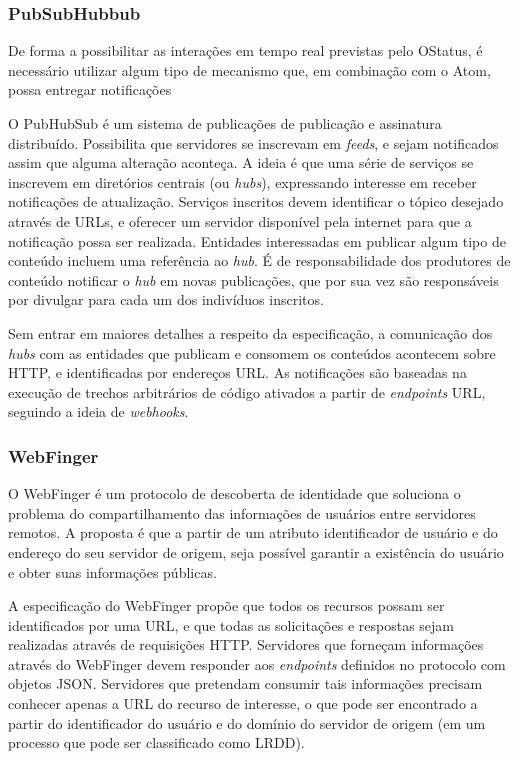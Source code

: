 \subsubsection{PubSubHubbub}

De forma a possibilitar as interações em tempo real previstas pelo  OStatus, é
necessário utilizar algum tipo de mecanismo que, em combinação com o Atom, possa
entregar notificações 

O PubHubSub é um sistema de publicações de publicação e assinatura distribuído.
Possibilita que servidores se inscrevam em \textit{feeds}, e sejam notificados assim
que alguma alteração aconteça. A ideia é que uma série de serviços se inscrevem em
diretórios centrais (ou \textit{hubs}), expressando interesse em receber notificações
de atualização. Serviços inscritos devem identificar o tópico desejado através de
URLs, e oferecer um servidor disponível pela internet para que a notificação possa
ser realizada. Entidades interessadas em publicar algum tipo de conteúdo incluem uma
referência ao \textit{hub}. É de responsabilidade dos produtores de conteúdo
notificar o \textit{hub} em novas publicações, que por sua vez são responsáveis por
divulgar para cada um dos indivíduos inscritos.

Sem entrar em maiores detalhes a respeito da especificação, a comunicação dos
\textit{hubs} com as entidades que publicam e consomem os conteúdos acontecem sobre
HTTP, e identificadas por endereços URL. As notificações são baseadas na execução de
trechos arbitrários de código ativados a partir de \textit{endpoints} URL, seguindo a
ideia de \textit{webhooks}.

\subsubsection{WebFinger}


O WebFinger é um protocolo de descoberta de identidade que soluciona o problema do
compartilhamento das informações de usuários entre servidores remotos. A proposta é
que a partir de um atributo identificador de usuário e do endereço do seu servidor de
origem, seja possível garantir a existência do usuário e obter suas informações
públicas.

A especificação do WebFinger propõe que todos os recursos possam ser identificados
por uma URL, e que todas as solicitações e respostas sejam realizadas através de
requisições HTTP. Servidores que forneçam informações através do WebFinger devem
responder aos \textit{endpoints} definidos no protocolo com objetos JSON. Servidores
que pretendam consumir tais informações precisam conhecer apenas a URL do recurso de
interesse, o que pode ser encontrado a partir do identificador do usuário e do
domínio do servidor de origem (em um processo que pode ser classificado como LRDD). 

